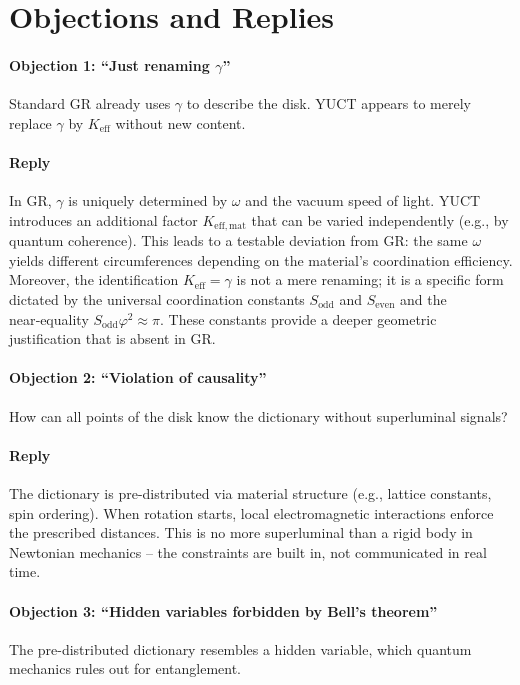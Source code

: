 \documentclass[12pt,a4paper]{article}
\newcommand{\Sodd}{S_{\mathrm{odd}}}
\newcommand{\Seven}{S_{\mathrm{even}}}
\begin{document}
	\section{Objections and Replies}
	\label{sec:objections}
	
	\paragraph{Objection 1: ``Just renaming \(\gamma\)''}
	Standard GR already uses \(\gamma\) to describe the disk. YUCT appears to merely replace \(\gamma\) by \(K_{\mathrm{eff}}\) without new content.
	
	\paragraph{Reply}
	In GR, \(\gamma\) is uniquely determined by \(\omega\) and the vacuum speed of light. YUCT introduces an additional factor \(K_{\mathrm{eff,mat}}\) that can be varied independently (e.g., by quantum coherence). This leads to a testable deviation from GR: the same \(\omega\) yields different circumferences depending on the material's coordination efficiency. Moreover, the identification \(K_{\mathrm{eff}} = \gamma\) is not a mere renaming; it is a specific form dictated by the universal coordination constants \(\Sodd\) and \(\Seven\) and the near‑equality \(\Sodd \varphi^2 \approx \pi\). These constants provide a deeper geometric justification that is absent in GR.
	
	\paragraph{Objection 2: ``Violation of causality''}
	How can all points of the disk know the dictionary without superluminal signals?
	
	\paragraph{Reply}
	The dictionary is pre-distributed via material structure (e.g., lattice constants, spin ordering). When rotation starts, local electromagnetic interactions enforce the prescribed distances. This is no more superluminal than a rigid body in Newtonian mechanics -- the constraints are built in, not communicated in real time.
	
	\paragraph{Objection 3: ``Hidden variables forbidden by Bell's theorem''}
	The pre-distributed dictionary resembles a hidden variable, which quantum mechanics rules out for entanglement.
	
\end{document}

